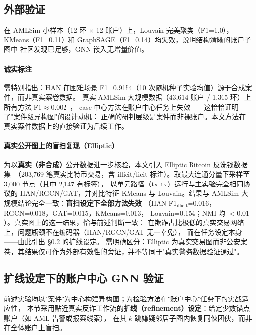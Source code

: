 \documentclass[12pt,a4paper]{ctexart}
\begin{document}
\subsection{外部验证}
\label{sec:external}

在 AMLSim 小样本（12 环 $\times$ 12 账户）上，Louvain 完美聚类（F1=1.0），
KMeans（F1=0.11）和 GraphSAGE（F1=0.14）均失效，说明结构清晰的账户子图中
社区发现已足够，GNN 嵌入无增量价值。

\paragraph{诚实标注} 需特别指出：HAN 在困难场景 F1=0.9154（10 次随机种子实验均值）源于合成案件，而非真实案卷数据。
真实 AMLSim 大规模数据（43,614 账户 / 1,305 环）上所有方法 F1$\approx$0.002~\cite{weber2018amlfirstlook}，
case 中心方法在账户中心任务上失效——这恰恰证明了"案件级异构图"的设计动机：
正确的研判层级是案件而非裸账户。本文方法在真实案件数据上的直接验证为后续工作。

\paragraph{真实公开图上的盲扫复现（Elliptic）}
为以\textbf{真实（非合成）}公开数据进一步核验，本文引入 Elliptic Bitcoin
反洗钱数据集~\cite{weber2019elliptic}（203{,}769 笔真实比特币交易，含
illicit/licit 标注）。取最大连通分量下采样至 3{,}000 节点（其中 2{,}147 有标签），
以单元路径（tx--tx）运行与主实验完全相同协议的 HAN/RGCN/GAT，并对比特征
KMeans 与 Louvain。结果与 AMLSim 大规模结论完全一致：\textbf{盲扫设定下全部方法失效}
（HAN F1$_{\text{illicit}}$=0.016，RGCN=0.018，GAT=0.015，KMeans=0.013，
Louvain=0.154；NMI 均 $<0.01$）。真实图上的这一结果，恰与前述判断一致：
在欺诈占比极低的真实交易网络上，问题瓶颈不在编码器（HAN/RGCN/GAT 无一幸免），
而在任务设定本身——由此引出 §\ref{sec:refinement} 的扩线设定。
需明确区分：Elliptic 为真实交易图而非公安案卷，其结果仅可作为外部有效性的旁证，并不等同于"真实警务数据验证通过"。

\subsection{扩线设定下的账户中心 GNN 验证}
\label{sec:refinement}

前述实验均以"案件"为中心构建异构图；为检验方法在"账户中心"任务下的实战适应性，
本节采用贴近真实反诈工作流的\textbf{扩线（refinement）设定}：给定少数锚点账户（如 AML 告警或报案线索），
在其 $k$ 跳嫌疑邻居子图内恢复同伙团伙，而非在全体账户上盲扫。
\end{document}
